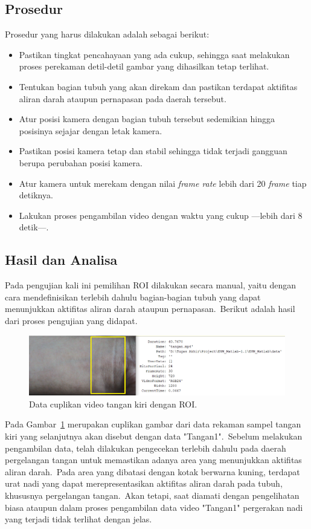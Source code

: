 \subsection{Prosedur}
Prosedur yang harus dilakukan adalah sebagai berikut:
\begin{itemize}
	\item Pastikan tingkat pencahayaan yang ada cukup, sehingga saat melakukan proses perekaman detil-detil gambar yang dihasilkan tetap terlihat.
	\item Tentukan bagian tubuh yang akan direkam dan pastikan terdapat aktifitas aliran darah ataupun pernapasan pada daerah tersebut.~
	\item Atur posisi kamera dengan bagian tubuh tersebut sedemikian hingga posisinya sejajar dengan letak kamera.
	\item Pastikan posisi kamera tetap dan stabil sehingga tidak terjadi gangguan berupa perubahan posisi kamera.
	\item Atur kamera untuk merekam dengan nilai \textit{frame rate} lebih dari 20 \textit{frame} tiap detiknya.
	\item Lakukan proses pengambilan video dengan waktu yang cukup ---lebih dari 8 detik---.
\end{itemize}

\subsection{Hasil dan Analisa}
Pada pengujian kali ini pemilihan ROI dilakukan secara manual, yaitu dengan cara mendefinisikan terlebih dahulu bagian-bagian tubuh yang dapat menunjukkan aktifitas aliran darah ataupun pernapasan.~Berikut adalah hasil dari proses pengujian yang didapat.

\begin{figure}[ht]
	\vspace{0.5em}
	\centering
	\includegraphics[width=\textwidth]{tangan1_roi}
	\caption{Data cuplikan video tangan kiri dengan ROI.}
	\label{fig:tangan1}   
\end{figure}
Pada Gambar~\ref{fig:tangan1} merupakan cuplikan gambar dari data rekaman sampel tangan kiri yang selanjutnya akan disebut dengan data "Tangan1".~Sebelum melakukan pengambilan data, telah dilakukan pengecekan terlebih dahulu pada daerah pergelangan tangan untuk memastikan adanya area yang menunjukkan aktifitas aliran darah.~Pada area yang dibatasi dengan kotak berwarna kuning, terdapat urat nadi yang dapat merepresentasikan aktifitas aliran darah pada tubuh, khususnya pergelangan tangan.~Akan tetapi, saat diamati dengan pengelihatan biasa ataupun dalam proses pengambilan data video "Tangan1" pergerakan nadi yang terjadi tidak terlihat dengan jelas.

